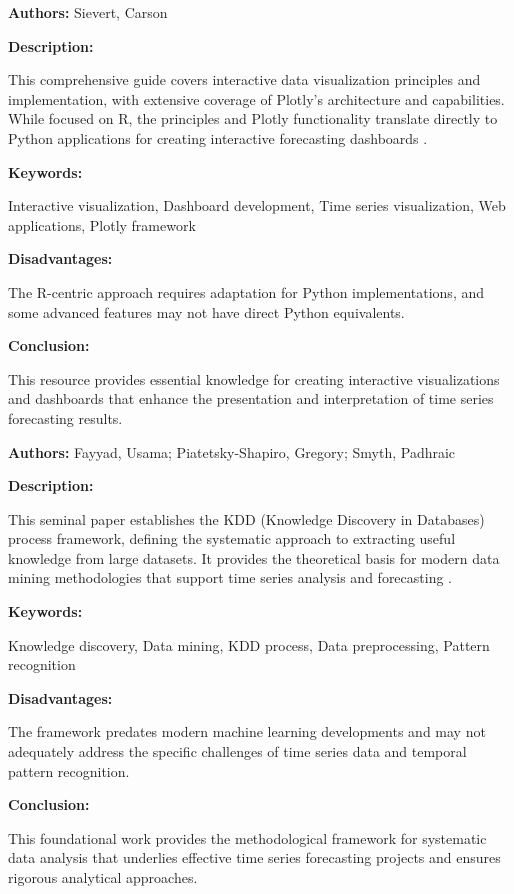 
{ 
	
	\textbf{Authors:} Sievert, Carson
	
	\textbf{Description:}
	
	This comprehensive guide covers interactive data visualization principles and implementation, with extensive coverage of Plotly's architecture and capabilities. While focused on R, the principles and Plotly functionality translate directly to Python applications for creating interactive forecasting dashboards \autocite{Sievert:2020}.
	
	\textbf{Keywords:}
	
	Interactive visualization, Dashboard development, Time series visualization, Web applications, Plotly framework
	
	\textbf{Disadvantages:}
	
	The R-centric approach requires adaptation for Python implementations, and some advanced features may not have direct Python equivalents.
	
	\textbf{Conclusion:}
	
	This resource provides essential knowledge for creating interactive visualizations and dashboards that enhance the presentation and interpretation of time series forecasting results.
	
}


{ 
	
	\textbf{Authors:} Fayyad, Usama; Piatetsky-Shapiro, Gregory; Smyth, Padhraic
	
	\textbf{Description:}
	
	This seminal paper establishes the KDD (Knowledge Discovery in Databases) process framework, defining the systematic approach to extracting useful knowledge from large datasets. It provides the theoretical basis for modern data mining methodologies that support time series analysis and forecasting \autocite{Fayyad:1996}.
	
	\textbf{Keywords:}
	
	Knowledge discovery, Data mining, KDD process, Data preprocessing, Pattern recognition
	
	\textbf{Disadvantages:}
	
	The framework predates modern machine learning developments and may not adequately address the specific challenges of time series data and temporal pattern recognition.
	
	\textbf{Conclusion:}
	
	This foundational work provides the methodological framework for systematic data analysis that underlies effective time series forecasting projects and ensures rigorous analytical approaches.
	
}


